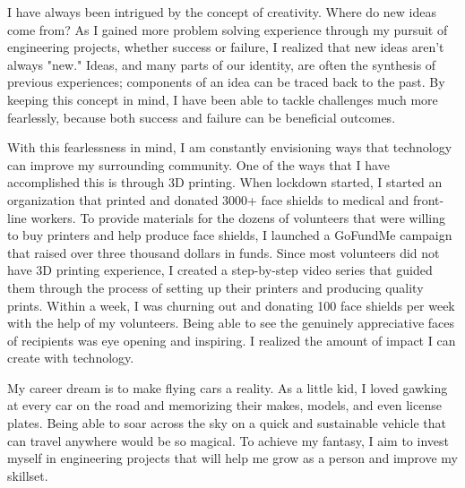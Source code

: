 \documentclass[11pt, letterpaper]{awesome-cv} %
\begin{document}
\makecvheader %

\makelettertitle %


\begin{cvletter}

I have always been intrigued by the concept of creativity. Where do new ideas come from? As I gained more problem solving experience through my pursuit of engineering projects, whether success or failure, I realized that new ideas aren't always "new." Ideas, and many parts of our identity, are often the synthesis of previous experiences; components of an idea can be traced back to the past. By keeping this concept in mind, I have been able to tackle challenges much more fearlessly, because both success and failure can be beneficial outcomes.

With this fearlessness in mind, I am constantly envisioning ways that technology can improve my surrounding community. One of the ways that I have accomplished this is through 3D printing. When lockdown started, I started an organization that printed and donated 3000+ face shields to medical and front-line workers. To provide materials for the dozens of volunteers that were willing to buy printers and help produce face shields, I launched a GoFundMe campaign that raised over three thousand dollars in funds. Since most volunteers did not have 3D printing experience, I created a step-by-step video series that guided them through the process of setting up their printers and producing quality prints. Within a week, I was churning out and donating 100 face shields per week with the help of my volunteers. Being able to see the genuinely appreciative faces of recipients was eye opening and inspiring. I realized the amount of impact I can create with technology. 

My career dream is to make flying cars a reality. As a little kid, I loved gawking at every car on the road and memorizing their makes, models, and even license plates. Being able to soar across the sky on a quick and sustainable vehicle that can travel anywhere would be so magical. To achieve my fantasy, I aim to invest myself in engineering projects that will help me grow as a person and improve my skillset.
\end{cvletter}

\recipient{}{} 



\recipient{}{} 
\end{document}
